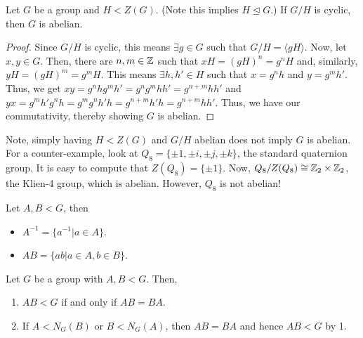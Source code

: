 \documentclass[11pt,leqno,oneside]{amsart}
\newcommand{\subgroup}{\mathrel{<}}
\newcommand{\normsubgroup}{\mathrel{\unlhd}}
\newcommand{\isom}{\mathrel{\cong}}
\begin{document}
    \begin{lem}
        Let $G$ be a group and $H \subgroup Z(G)$. (Note this implies $H
        \normsubgroup G$.) If $G/H$ is cyclic, then $G$ is abelian.
    \end{lem}
    \begin{proof}
        Since $G/H$ is cyclic, this means $\exists g \in G$ such that
        $G/H=\langle gH \rangle$. Now, let $x,y \in G$. Then, there are $n,m
        \in {\mathbb Z}$ such that $xH = (gH)^n = g^nH$ and, similarly, $yH = (gH)^m =
        g^mH$. This means $\exists h,h' \in H$ such that $x=g^nh$ and
        $y=g^mh'$. Thus, we get $xy = g^nhg^mh' = g^ng^mhh' = g^{n+m}hh'$ and
        $yx = g^mh'g^nh = g^mg^nh'h = g^{n+m}h'h = g^{n+m}hh'$. Thus, we have
        our commutativity, thereby showing $G$ is abelian.
    \end{proof}
    \begin{rmk*}
        Note, simply having $H \subgroup Z(G)$ and $G/H$ abelian does not imply
        $G$ is abelian. For a counter-example, look at $Q_8 = \{\pm 1, \pm i,
        \pm j, \pm k\}$, the standard quaternion group. It is easy to compute
        that $Z(Q_8) = \{\pm 1\}$. Now, $Q_8/Z(Q_8) \isom \Z_2 \times \Z_2$,
        the Klien-4 group, which is abelian. However, $Q_8$ is not abelian!
    \end{rmk*}
    \begin{defn}
        Let $A,B \subgroup G$, then \begin{itemize}
            \item $A^{-1} = \{a^{-1} | a \in A\}$.
            \item $AB = \{ab | a \in A, b \in B\}$.
        \end{itemize}
    \end{defn}
    \begin{lem}
        Let $G$ be a group with $A,B \subgroup G$. Then,
        \begin{enumerate}
            \item $AB \subgroup G$ if and only if $AB = BA$.
            \item If $A \subgroup N_G(B)$ or $B \subgroup N_G(A)$, then $AB =
                BA$ and hence $AB \subgroup G$ by 1.
        \end{enumerate}
    \end{lem}
\end{document}
